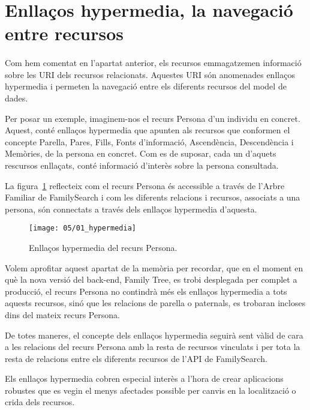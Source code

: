\section{Enllaços hypermedia, la navegació entre recursos}

    \paragraph{}
    Com hem comentat en l’apartat anterior, els recursos emmagatzemen informació sobre les URI dels recursos relacionats. Aquestes URI són anomenades enllaços hypermedia i permeten la navegació  entre els diferents recursos del model de dades.

    Per posar un exemple, imaginem-nos el recurs Persona d'un individu en concret. Aquest, conté enllaços hypermedia que apunten als recursos que conformen el concepte Parella, Pares, Fills, Fonts d'informació, Ascendència, Descendència i Memòries, de la persona en concret. Com es de suposar, cada un d'aquets rescursos enllaçats, conté informació d'interès sobre la persona consultada.

    La figura~\ref{fig:hypermedia} reflecteix com el recurs Persona és accessible a través de l'Arbre Familiar de FamilySearch i com les diferents relacions i recursos, associats a una persona, són connectats a través dels enllaços hypermedia d'aquesta.

    \begin{figure}[h]
        \texttt{[image: 05/01\_hypermedia]}
        \centering
        \caption{Enllaços hypermedia del recurs Persona.}\label{fig:hypermedia}
    \end{figure}

    Volem aprofitar aquest apartat de la memòria per recordar, que en el moment en què la nova versió del back-end, Family Tree, es trobi desplegada per complet a producció, el recurs Persona no contindrà més els enllaços hypermedia a tots aquests recursos, sinó que les relacions de parella o paternals, es trobaran incloses dins del mateix recurs Persona.

    De totes maneres, el concepte dels enllaços hypermedia seguirà sent vàlid de cara a les relacions del recurs Persona amb la resta de recursos vinculats i per tota la resta de relacions entre els diferents recursos de l'API de FamilySearch.

    Els enllaços hypermedia cobren especial interès a l'hora de crear aplicacions robustes que es vegin el menys afectades possible per canvis en la localització o crida dels recursos.


